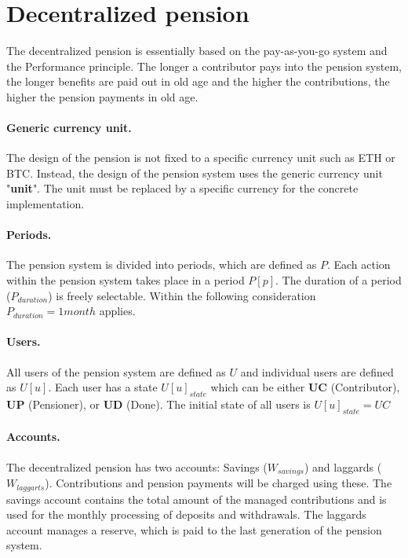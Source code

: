 \section{Decentralized pension}
The decentralized pension is essentially based on the pay-as-you-go system and the
Performance principle. The longer a contributor pays into the pension system, 
the longer benefits are paid out in old age and the higher the contributions,
the higher the pension payments in old age.

\paragraph{Generic currency unit.} The design of the pension is not fixed to a specific currency unit such as ETH or BTC. Instead, the design of the pension system uses the generic currency unit "\textbf{unit}". The unit must be replaced by a specific currency for the concrete implementation.

\paragraph{Periods.} The pension system is divided into periods, which are defined as $P$. Each action within the pension system takes place in a period $P[p]$. The duration of a period ($P_{duration}$) is freely selectable. Within the following consideration $P_{duration} = 1 month$ applies.

\paragraph{Users.} All users of the pension system are defined as $U$ and individual users are defined as $U[u]$. Each user has a state $U[u]_{state}$ which can be either \textbf{UC} (Contributor),
\textbf{UP} (Pensioner), or \textbf{UD} (Done).
The initial state of all users is $U[u]_{state} = UC$ 

\paragraph{Accounts.} The decentralized pension has two accounts: Savings ($W_{savings}$) and laggards  ($W_{laggarts}$). Contributions and pension payments will be charged using these. The savings account contains the total amount of the managed contributions and is used for the monthly processing of deposits and withdrawals. The laggards account manages a reserve, which is paid to the last generation of the pension system.

